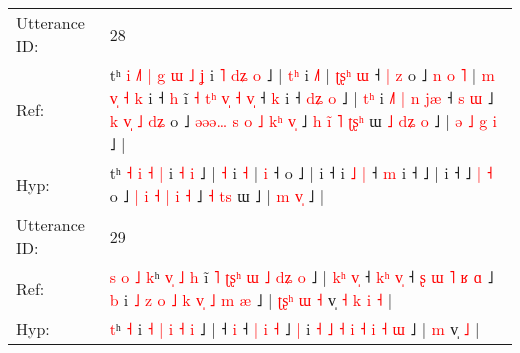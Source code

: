\documentclass[10pt]{article}
\DeclareRobustCommand{\hl}[1]{{\textcolor{red}{#1}}}
\begin{document}
\begin{longtable}{ll}
\midrule
Utterance ID: & 28 \\
Ref: & tʰ\hl{ }\hl{i}\hl{ }\hl{˩}\hl{˥}\hl{ }\hl{|} \hl{g} \hl{ɯ} \hl{˩} \hl{ʝ} i\hl{ }\hl{˥} \hl{d}\hl{ʑ} \hl{o} ˩ | \hl{t}\hl{ʰ} i \hl{˩}\hl{˥} |\hl{ }\hl{ʈ}\hl{ʂ}\hl{ʰ} \hl{ɯ} ˧\hl{ }\hl{|}\hl{ }\hl{z} o ˩\hl{ }\hl{n}\hl{ }\hl{o}\hl{ }\hl{˥} |\hl{ }\hl{m}\hl{ }\hl{v}\hl{̩}\hl{ }\hl{˧}\hl{ }\hl{k} i ˧\hl{ }\hl{h} i\hl{̃}\hl{ }\hl{˧}\hl{ }\hl{t}\hl{ʰ}\hl{ }\hl{v}\hl{̩} \hl{˧} \hl{v}\hl{̩} ˧ \hl{k} i ˧\hl{ }\hl{d}\hl{ʑ}\hl{ }\hl{o} ˩ |\hl{ }\hl{t}\hl{ʰ} i\hl{ }\hl{˩}\hl{˥}\hl{ }\hl{|}\hl{ }\hl{n}\hl{ }\hl{j}\hl{æ} ˧\hl{ }\hl{s}\hl{ }\hl{ɯ} ˩\hl{ }\hl{k}\hl{ }\hl{v}\hl{̩} \hl{˩} \hl{d}\hl{ʑ} o ˩ \hl{ə}\hl{ə}\hl{ə}\hl{…} \hl{s} \hl{o} \hl{˩} \hl{k}\hl{ʰ} \hl{v}\hl{̩} ˩\hl{ }\hl{h}\hl{ }\hl{i}\hl{̃} \hl{˥} \hl{ʈ}\hl{ʂ}\hl{ʰ} ɯ\hl{ }\hl{˩}\hl{ }\hl{d}\hl{ʑ}\hl{ }\hl{o} ˩ |\hl{ }\hl{ə} \hl{˩} \hl{g}\hl{ }\hl{i} ˩ |
 \\
Hyp: & tʰ\hl{}\hl{}\hl{}\hl{}\hl{}\hl{}\hl{} \hl{˧} \hl{i} \hl{˧} \hl{|} i\hl{}\hl{} \hl{}\hl{˧} \hl{i} ˩ | \hl{}\hl{˧} i \hl{}\hl{˧} |\hl{}\hl{}\hl{}\hl{} \hl{i} ˧\hl{}\hl{}\hl{}\hl{} o ˩\hl{}\hl{}\hl{}\hl{}\hl{}\hl{} |\hl{}\hl{}\hl{}\hl{}\hl{}\hl{}\hl{}\hl{}\hl{} i ˧\hl{}\hl{} i\hl{}\hl{}\hl{}\hl{}\hl{}\hl{}\hl{}\hl{}\hl{} \hl{˩} \hl{}\hl{|} ˧ \hl{m} i ˧\hl{}\hl{}\hl{}\hl{}\hl{} ˩ |\hl{}\hl{}\hl{} i\hl{}\hl{}\hl{}\hl{}\hl{}\hl{}\hl{}\hl{}\hl{}\hl{} ˧\hl{}\hl{}\hl{}\hl{} ˩\hl{}\hl{}\hl{}\hl{}\hl{} \hl{|} \hl{}\hl{˧} o ˩ \hl{}\hl{}\hl{}\hl{|} \hl{i} \hl{˧} \hl{|} \hl{}\hl{i} \hl{}\hl{˧} ˩\hl{}\hl{}\hl{}\hl{}\hl{} \hl{˧} \hl{}\hl{t}\hl{s} ɯ\hl{}\hl{}\hl{}\hl{}\hl{}\hl{}\hl{} ˩ |\hl{}\hl{} \hl{m} \hl{}\hl{v}\hl{̩} ˩ |
 \\
\midrule
Utterance ID: & 29 \\
Ref: & \hl{s}\hl{ }\hl{o}\hl{ }\hl{˩}\hl{ }\hl{k}ʰ\hl{ }\hl{v}\hl{̩}\hl{ }\hl{˩} \hl{h} i\hl{̃}\hl{ }\hl{˥} \hl{ʈ}\hl{ʂ}\hl{ʰ} \hl{ɯ} \hl{˩} \hl{d}\hl{ʑ} \hl{o} ˩ |\hl{ }\hl{k}\hl{ʰ}\hl{ }\hl{v}\hl{̩} ˧\hl{ }\hl{k}\hl{ʰ} \hl{v}\hl{̩} ˧\hl{ }\hl{ʂ}\hl{ }\hl{ɯ} \hl{˥} \hl{ʁ} \hl{ɑ} ˩ \hl{b} i\hl{ }\hl{˩} \hl{z} \hl{o} \hl{˩} \hl{k} \hl{v}\hl{̩} \hl{˩} \hl{m} \hl{æ} ˩ |\hl{ }\hl{ʈ}\hl{ʂ}\hl{ʰ}\hl{ }\hl{ɯ} \hl{˧} v̩\hl{ }\hl{˧}\hl{ }\hl{k}\hl{ }\hl{i} \hl{˧} |
 \\
Hyp: & \hl{}\hl{}\hl{}\hl{}\hl{}\hl{}\hl{t}ʰ\hl{}\hl{}\hl{}\hl{}\hl{} \hl{˧} i\hl{}\hl{}\hl{} \hl{}\hl{}\hl{˧} \hl{|} \hl{i} \hl{}\hl{˧} \hl{i} ˩ |\hl{}\hl{}\hl{}\hl{}\hl{}\hl{} ˧\hl{}\hl{}\hl{} \hl{}\hl{i} ˧\hl{}\hl{}\hl{}\hl{} \hl{|} \hl{i} \hl{˧} ˩ \hl{|} i\hl{}\hl{} \hl{˧} \hl{˩} \hl{˧} \hl{i} \hl{}\hl{˧} \hl{i} \hl{˧} \hl{ɯ} ˩ |\hl{}\hl{}\hl{}\hl{}\hl{}\hl{} \hl{m} v̩\hl{}\hl{}\hl{}\hl{}\hl{}\hl{} \hl{˩} |

\end{longtable}
\end{document}
